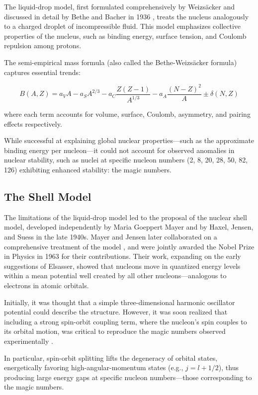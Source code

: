 The liquid-drop model, first formulated comprehensively by Weizsäcker \cite{Weizsacker_1935} and discussed in detail by Bethe and Bacher in 1936 \cite{bethe_nuclear_1936}, treats the nucleus analogously to a charged droplet of incompressible fluid. This model emphasizes collective properties of the nucleus, such as binding energy, surface tension, and Coulomb repulsion among protons.

The semi-empirical mass formula (also called the Bethe-Weizsäcker formula) captures essential trends:

\[B(A,Z) = a_VA - a_SA^{2/3} - a_C\frac{Z(Z-1)}{A^{1/3}} - a_A\frac{(N-Z)^2}{A}\pm \delta(N,Z)\]

where each term accounts for volume, surface, Coulomb, asymmetry, and pairing effects respectively.

While successful at explaining global nuclear properties—such as the approximate binding energy per nucleon—it could not account for observed anomalies in nuclear stability, such as nuclei at specific nucleon numbers (2, 8, 20, 28, 50, 82, 126) exhibiting enhanced stability: the magic numbers.

\subsection{The Shell Model}

The limitations of the liquid-drop model led to the proposal of the nuclear shell model, developed independently by Maria Goeppert Mayer \cite{mayer_1948} and by Haxel, Jensen, and Suess \cite{haxel_magic_nodate} in the late 1940s. Mayer and Jensen later collaborated on a comprehensive treatment of the model \cite{MayerandJensen_1955}, and were jointly awarded the Nobel Prize in Physics in 1963 for their contributions. Their work, expanding on the early suggestions of Elsasser, showed that nucleons move in quantized energy levels within a mean potential well created by all other nucleons—analogous to electrons in atomic orbitals.

Initially, it was thought that a simple three-dimensional harmonic oscillator potential could describe the structure. However, it was soon realized that including a strong spin-orbit coupling term, where the nucleon's spin couples to its orbital motion, was critical to reproduce the magic numbers observed experimentally \cite{mayer_shell_1968}.

In particular, spin-orbit splitting lifts the degeneracy of orbital states, energetically favoring high-angular-momentum states (e.g., $j=l+1/2$), thus producing large energy gaps at specific nucleon numbers—those corresponding to the magic numbers.

